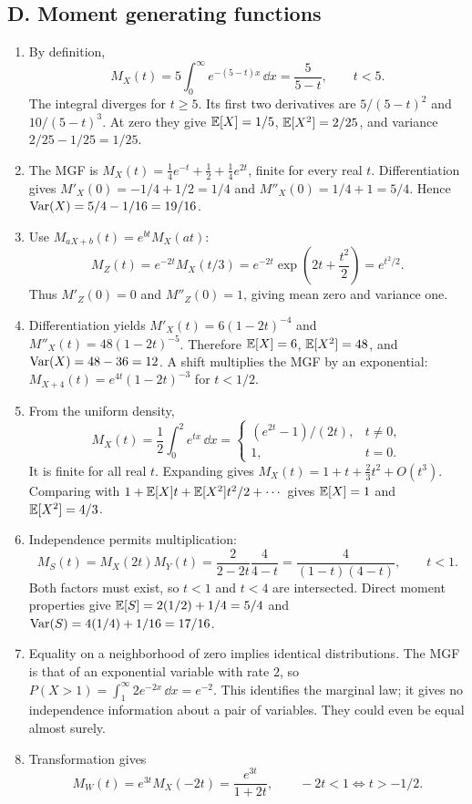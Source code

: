 \subsection{D. Moment generating functions}
\begin{enumerate}[label=\textbf{D\arabic*.},leftmargin=*,itemsep=1em]
\item By definition,
\[
M_X(t)=5\int_0^\infty e^{-(5-t)x}\,\dd x=\frac5{5-t},\qquad t<5.
\]
The integral diverges for $t\geq5$. Its first two derivatives are $5/(5-t)^2$ and $10/(5-t)^3$. At zero they give $\mathbb E[X]=1/5$, $\mathbb E[X^2]=2/25$, and variance $2/25-1/25=1/25$.
\item The MGF is $M_X(t)=\tfrac14e^{-t}+\tfrac12+\tfrac14e^{2t}$, finite for every real $t$. Differentiation gives $M'_X(0)=-1/4+1/2=1/4$ and $M''_X(0)=1/4+1=5/4$. Hence $\operatorname{Var}(X)=5/4-1/16=19/16$.
\item Use $M_{aX+b}(t)=e^{bt}M_X(at)$:
\[
M_Z(t)=e^{-2t}M_X(t/3)
=e^{-2t}\exp\left(2t+\frac{t^2}{2}\right)=e^{t^2/2}.
\]
Thus $M'_Z(0)=0$ and $M''_Z(0)=1$, giving mean zero and variance one.
\item Differentiation yields $M'_X(t)=6(1-2t)^{-4}$ and $M''_X(t)=48(1-2t)^{-5}$. Therefore $\mathbb E[X]=6$, $\mathbb E[X^2]=48$, and $\operatorname{Var}(X)=48-36=12$. A shift multiplies the MGF by an exponential: $M_{X+4}(t)=e^{4t}(1-2t)^{-3}$ for $t<1/2$.
\item From the uniform density,
\[
M_X(t)=\frac12\int_0^2e^{tx}\,\dd x=
\begin{cases}(e^{2t}-1)/(2t),&t\ne0,\\1,&t=0.\end{cases}
\]
It is finite for all real $t$. Expanding gives $M_X(t)=1+t+\tfrac23t^2+O(t^3)$. Comparing with $1+\mathbb E[X]t+\mathbb E[X^2]t^2/2+\cdots$ gives $\mathbb E[X]=1$ and $\mathbb E[X^2]=4/3$.
\item Independence permits multiplication:
\[
M_S(t)=M_X(2t)M_Y(t)=\frac2{2-2t}\frac4{4-t}
=\frac4{(1-t)(4-t)},\qquad t<1.
\]
Both factors must exist, so $t<1$ and $t<4$ are intersected. Direct moment properties give $\mathbb E[S]=2(1/2)+1/4=5/4$ and $\operatorname{Var}(S)=4(1/4)+1/16=17/16$.
\item Equality on a neighborhood of zero implies identical distributions. The MGF is that of an exponential variable with rate $2$, so $P(X>1)=\int_1^\infty2e^{-2x}\,\dd x=e^{-2}$. This identifies the marginal law; it gives no independence information about a pair of variables. They could even be equal almost surely.
\item Transformation gives
\[
M_W(t)=e^{3t}M_X(-2t)=\frac{e^{3t}}{1+2t},\qquad -2t<1\iff t>-1/2.
\]
\end{enumerate}
